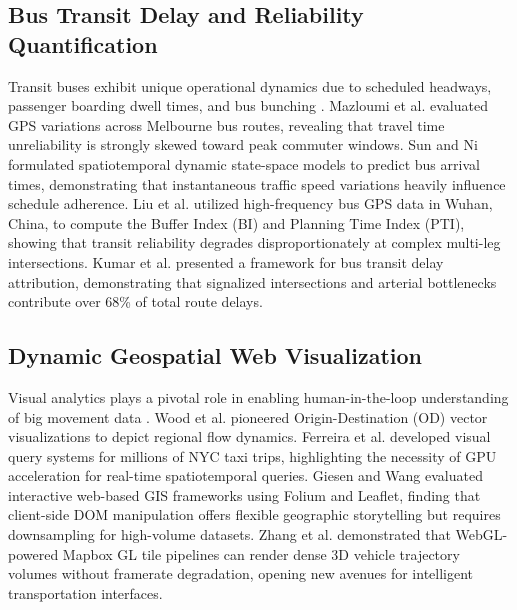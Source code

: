 \documentclass[conference]{IEEEtran}
\begin{document}
\subsection{Bus Transit Delay and Reliability Quantification}
Transit buses exhibit unique operational dynamics due to scheduled headways, passenger boarding dwell times, and bus bunching \cite{mazloumi2010using, cats2015planning}. Mazloumi et al. \cite{mazloumi2010using} evaluated GPS variations across Melbourne bus routes, revealing that travel time unreliability is strongly skewed toward peak commuter windows. Sun and Ni \cite{sun2014predicting} formulated spatiotemporal dynamic state-space models to predict bus arrival times, demonstrating that instantaneous traffic speed variations heavily influence schedule adherence. Liu et al. \cite{liu2019spatiotemporal} utilized high-frequency bus GPS data in Wuhan, China, to compute the Buffer Index (BI) and Planning Time Index (PTI), showing that transit reliability degrades disproportionately at complex multi-leg intersections. Kumar et al. \cite{kumar2022comprehensive} presented a framework for bus transit delay attribution, demonstrating that signalized intersections and arterial bottlenecks contribute over 68\% of total route delays.

\subsection{Dynamic Geospatial Web Visualization}
Visual analytics plays a pivotal role in enabling human-in-the-loop understanding of big movement data \cite{andrienko2017visual, ferreira2013visual}. Wood et al. \cite{wood2010visualisation} pioneered Origin-Destination (OD) vector visualizations to depict regional flow dynamics. Ferreira et al. \cite{ferreira2013visual} developed visual query systems for millions of NYC taxi trips, highlighting the necessity of GPU acceleration for real-time spatiotemporal queries. Giesen and Wang \cite{giesen2019interactive} evaluated interactive web-based GIS frameworks using Folium and Leaflet, finding that client-side DOM manipulation offers flexible geographic storytelling but requires downsampling for high-volume datasets. Zhang et al. \cite{zhang2023mining} demonstrated that WebGL-powered Mapbox GL tile pipelines can render dense 3D vehicle trajectory volumes without framerate degradation, opening new avenues for intelligent transportation interfaces.
\end{document}
